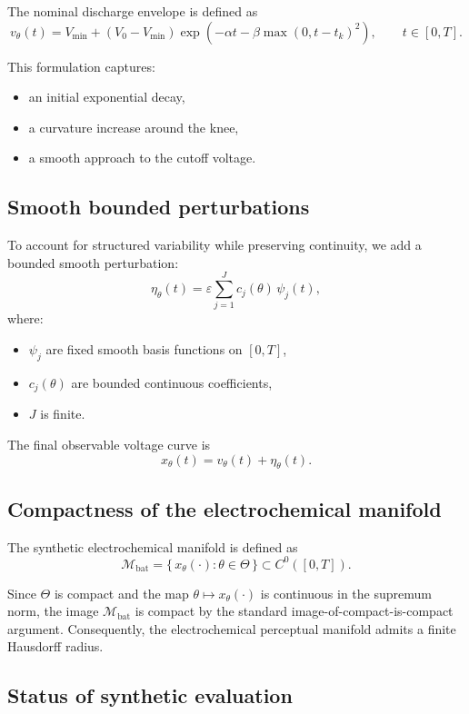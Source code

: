 \documentclass[10pt]{article}
\theoremstyle{plain}
\theoremstyle{definition}
\theoremstyle{remark}
\begin{document}
The nominal discharge envelope is defined as
\[
v_\theta(t) =
V_{\min}
+ (V_0 - V_{\min})
\exp\!\left(
- \alpha t
- \beta \max(0, t - t_k)^2
\right),
\qquad t \in [0,T].
\]

This formulation captures:
\begin{itemize}
    \item an initial exponential decay,
    \item a curvature increase around the knee,
    \item a smooth approach to the cutoff voltage.
\end{itemize}

\subsection{Smooth bounded perturbations}

To account for structured variability while preserving continuity, we add a
bounded smooth perturbation:
\[
\eta_\theta(t)
= \varepsilon \sum_{j=1}^{J} c_j(\theta)\,\psi_j(t),
\]
where:
\begin{itemize}
    \item $\psi_j$ are fixed smooth basis functions on $[0,T]$,
    \item $c_j(\theta)$ are bounded continuous coefficients,
    \item $J$ is finite.
\end{itemize}

The final observable voltage curve is
\[
x_\theta(t) = v_\theta(t) + \eta_\theta(t).  
\]

\subsection{Compactness of the electrochemical manifold}

The synthetic electrochemical manifold is defined as
\[
\mathcal{M}_{\mathrm{bat}}
= \{\, x_\theta(\cdot) : \theta \in \Theta \,\}
\subset C^0([0,T]).
\]

Since $\Theta$ is compact and the map
$\theta \mapsto x_\theta(\cdot)$ is continuous in the supremum norm, the image
$\mathcal{M}_{\mathrm{bat}}$ is compact by the standard image-of-compact-is-compact
argument. Consequently, the electrochemical perceptual manifold admits a finite
Hausdorff radius.

\subsection{Status of synthetic evaluation}
\end{document}
